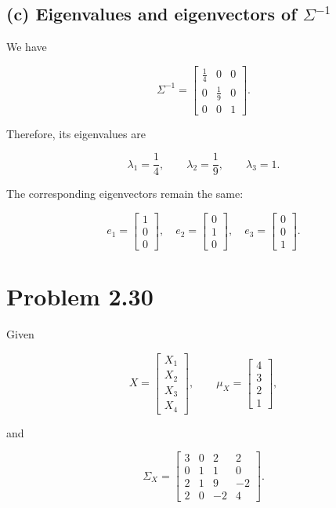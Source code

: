\documentclass[12pt]{article}
\begin{document}
\subsection*{(c) Eigenvalues and eigenvectors of $\Sigma^{-1}$}

We have

\[
\Sigma^{-1}
=
\begin{bmatrix}
\frac14&0&0\\
0&\frac19&0\\
0&0&1
\end{bmatrix}.
\]

Therefore, its eigenvalues are

\[
\boxed{
\lambda_1=\frac14,\qquad
\lambda_2=\frac19,\qquad
\lambda_3=1
}.
\]

The corresponding eigenvectors remain the same:

\[
\boxed{
e_1=
\begin{bmatrix}
1\\
0\\
0
\end{bmatrix},
\quad
e_2=
\begin{bmatrix}
0\\
1\\
0
\end{bmatrix},
\quad
e_3=
\begin{bmatrix}
0\\
0\\
1
\end{bmatrix}.
}
\]


\section*{Problem 2.30}

Given

\[
X=
\begin{bmatrix}
X_1\\
X_2\\
X_3\\
X_4
\end{bmatrix},
\qquad
\mu_X=
\begin{bmatrix}
4\\
3\\
2\\
1
\end{bmatrix},
\]

and

\[
\Sigma_X=
\begin{bmatrix}
3&0&2&2\\
0&1&1&0\\
2&1&9&-2\\
2&0&-2&4
\end{bmatrix}.
\]
\end{document}
